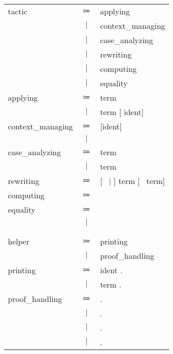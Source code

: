 \begin{table}[!htb]
    \centering\sl
    \begin{tabular}{lcl}
        tactic
            &$\Coloneqq$&applying\\
            &$\mid$&context\_managing\\
            &$\mid$&case\_analyzing\\
            &$\mid$&rewriting\\
            &$\mid$&computing\\
            &$\mid$&equality\\
        applying
            &$\Coloneqq$&\fexact{} term\\
            &$\mid$&\fapply{} term [\fin{} ident]\\
        context\_managing
            &$\Coloneqq$&\fintro{} [ident]\\
            &$\mid$&\fintros{}\\
        case\_analyzing
            &$\Coloneqq$&\fdestruct{} term\\
            &$\mid$&\finduction{} term\\
        rewriting
            &$\Coloneqq$&\frewrite{} [~\larrow{} $\mid$ \sarrow{}] term [~\fin{} term]\\
        computing
            &$\Coloneqq$&\fsimpl{}\\
        equality
            &$\Coloneqq$&\freflexivity{}\\
            &$\mid$&\fsymmetry{}\\\\\\

        helper
            &$\Coloneqq$&printing\\
            &$\mid$&proof\_handling\\
        printing
            &$\Coloneqq$&\fPrint{} ident .\\
            &$\mid$&\fCheck{} term .\\
        proof\_handling
            &$\Coloneqq$&\fUndo{} .\\
            &$\mid$&\fRestart{} .\\
            &$\mid$&\fAdmitted{} .\\
            &$\mid$&\fAbort{} .\\
    \end{tabular}
\end{table}
